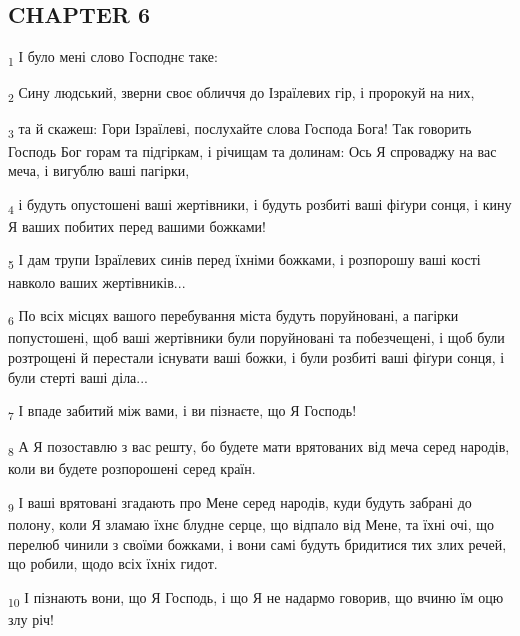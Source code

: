 \subsection{CHAPTER 6}
\begin{tcolorbox}
\textsubscript{1} І було мені слово Господнє таке:
\end{tcolorbox}
\begin{tcolorbox}
\textsubscript{2} Сину людський, зверни своє обличчя до Ізраїлевих гір, і пророкуй на них,
\end{tcolorbox}
\begin{tcolorbox}
\textsubscript{3} та й скажеш: Гори Ізраїлеві, послухайте слова Господа Бога! Так говорить Господь Бог горам та підгіркам, і річищам та долинам: Ось Я спроваджу на вас меча, і вигублю ваші пагірки,
\end{tcolorbox}
\begin{tcolorbox}
\textsubscript{4} і будуть опустошені ваші жертівники, і будуть розбиті ваші фіґури сонця, і кину Я ваших побитих перед вашими божками!
\end{tcolorbox}
\begin{tcolorbox}
\textsubscript{5} І дам трупи Ізраїлевих синів перед їхніми божками, і розпорошу ваші кості навколо ваших жертівників...
\end{tcolorbox}
\begin{tcolorbox}
\textsubscript{6} По всіх місцях вашого перебування міста будуть поруйновані, а пагірки попустошені, щоб ваші жертівники були поруйновані та побезчещені, і щоб були розтрощені й перестали існувати ваші божки, і були розбиті ваші фіґури сонця, і були стерті ваші діла...
\end{tcolorbox}
\begin{tcolorbox}
\textsubscript{7} І впаде забитий між вами, і ви пізнаєте, що Я Господь!
\end{tcolorbox}
\begin{tcolorbox}
\textsubscript{8} А Я позоставлю з вас решту, бо будете мати врятованих від меча серед народів, коли ви будете розпорошені серед країн.
\end{tcolorbox}
\begin{tcolorbox}
\textsubscript{9} І ваші врятовані згадають про Мене серед народів, куди будуть забрані до полону, коли Я зламаю їхнє блудне серце, що відпало від Мене, та їхні очі, що перелюб чинили з своїми божками, і вони самі будуть бридитися тих злих речей, що робили, щодо всіх їхніх гидот.
\end{tcolorbox}
\begin{tcolorbox}
\textsubscript{10} І пізнають вони, що Я Господь, і що Я не надармо говорив, що вчиню їм оцю злу річ!
\end{tcolorbox}
